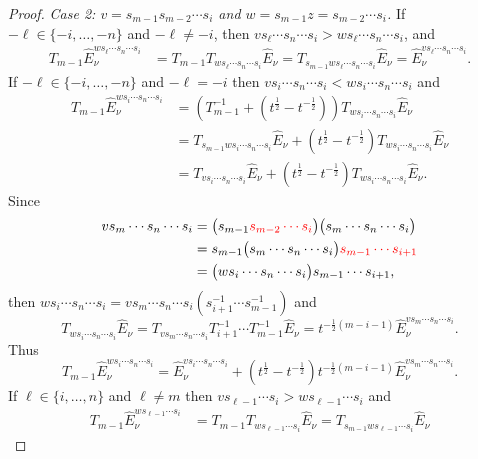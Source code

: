\documentclass[11pt]{article}
\theoremstyle{plain}
\theoremstyle{definition}
\theoremstyle{remark}
\numberwithin{equation}{section}
\newcounter{r}
\newcounter{s}
\begin{document}
\begin{proof} \emph{Case 2: $v= s_{m-1}s_{m-2}\cdots s_i$ and $w=s_{m-1}z=s_{m-2}\cdots s_i$.}
\hfil\break
If $-\ell\in \{-i, \ldots, -n\}$ and $-\ell \neq -i$, then 
$v s_\ell \cdots s_n \cdots s_i > w s_\ell\cdots s_n \cdots s_i$, and
\begin{align*}
T_{m-1} \widehat{E}^{ws_\ell \cdots s_n \cdots s_i}_\nu
&= T_{m-1}T_{ws_\ell \cdots s_n \cdots s_i}\widehat{E}_\nu
= T_{s_{m-1}ws_\ell\cdots s_n \cdots s_i}\widehat{E}_\nu
= \widehat{E}^{vs_\ell\cdots s_n \cdots s_i}_\nu.
\end{align*}
If $-\ell\in \{-i, \ldots, -n\}$ and $-\ell = -i$ then 
$vs_i\cdots s_n\cdots s_i < ws_i\cdots s_n\cdots s_i$ and
\begin{align*}
T_{m-1} \widehat{E}^{ws_i \cdots s_n \cdots s_i}_\nu
&= (T_{m-1}^{-1}+(t^{\frac12}-t^{-\frac12})) T_{ws_i \cdots s_n \cdots s_i}\widehat{E}_\nu
\\
&= T_{s_{m-1} w s_i \cdots s_n \cdots s_i}\widehat{E}_\nu
+(t^{\frac12}-t^{-\frac12}) T_{ws_i \cdots s_n \cdots s_i}\widehat{E}_\nu \\
&= T_{v s_i \cdots s_n \cdots s_i}\widehat{E}_\nu
+(t^{\frac12}-t^{-\frac12}) T_{ws_i \cdots s_n \cdots s_i}\widehat{E}_\nu.
\end{align*}
Since
\begin{align*}
v s_{m} \cdots s_{n} \cdots s_i &=
\big( s_{m-1} {\color{red} s_{m-2} \cdots s_i} \big)
\big(s_{m} \cdots s_{n} \cdots s_i \big) \\
&= s_{m-1} 
\big(s_{m} \cdots s_{n} \cdots s_i \big)
{\color{red} s_{m-1} \cdots s_{i+1}}  \\
&= \big( w s_i \cdots s_{n} \cdots s_i  \big)
s_{m-1} \cdots s_{i+1},
\end{align*}
then $w s_i \cdots s_{n} \cdots s_i = v s_{m} \cdots s_n \cdots s_i (s_{i+1}^{-1} \cdots s_{m-1}^{-1})$
and
$$
T_{ws_i\cdots s_n\cdots s_i}\widehat{E}_\nu 
= T_{vs_m\cdots s_n\cdots s_i}T_{i+1}^{-1}\cdots T_{m-1}^{-1}\widehat{E}_\nu 
= t^{-\frac12(m-i-1)}\widehat{E}^{vs_m\cdots s_n\cdots s_i}_\nu.
$$
Thus
$$
T_{m-1} \widehat{E}^{ws_i \cdots s_n \cdots s_i}_\nu
=
 \widehat{E}^{vs_i \cdots s_n \cdots s_i}_\nu
+(t^{\frac12}-t^{-\frac12}) t^{-\frac12(m-i-1)} \widehat{E}^{vs_m\cdots s_n\cdots s_i}_\nu.
$$
If $\ell\in \{i, \ldots, n\}$ and $\ell \neq m$ then $v s_{\ell-1} \cdots s_i > ws_{\ell-1} \cdots s_i$
and
\begin{align*}
T_{m-1} \widehat{E}^{ws_{\ell-1} \cdots  s_i}_\nu
&
= T_{m-1}T_{ws_{\ell-1} \cdots s_i}\widehat{E}_\nu
= T_{s_{m-1}ws_{\ell-1} \cdots s_i}\widehat{E}_\nu

\end{align*}
\end{proof}
\end{document}
